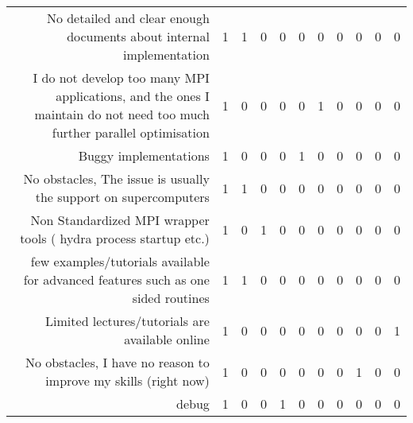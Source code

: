 {\begin{landscape}
\begin{longtable}[htb]{r|c|c|c|c|c|c|c|c|c|c}
{No detailed and clear enough documents about internal implementation} & 1 & 1 & 0 & 0 & 0 & 0 & 0 & 0 & 0 & 0 \\%
{I do not develop too many MPI applications, and the ones I maintain do not need too much further parallel optimisation} & 1 & 0 & 0 & 0 & 0 & 1 & 0 & 0 & 0 & 0 \\%
{Buggy implementations} & 1 & 0 & 0 & 0 & 1 & 0 & 0 & 0 & 0 & 0 \\%
{No obstacles, The issue is usually the support on supercomputers} & 1 & 1 & 0 & 0 & 0 & 0 & 0 & 0 & 0 & 0 \\%
{Non  Standardized MPI wrapper tools ( hydra process startup etc.)} & 1 & 0 & 1 & 0 & 0 & 0 & 0 & 0 & 0 & 0 \\%
{few examples/tutorials available for advanced features such as one sided routines} & 1 & 1 & 0 & 0 & 0 & 0 & 0 & 0 & 0 & 0 \\%
{Limited lectures/tutorials are available online} & 1 & 0 & 0 & 0 & 0 & 0 & 0 & 0 & 0 & 1 \\%
{No obstacles, I have no reason to improve my skills (right now)} & 1 & 0 & 0 & 0 & 0 & 0 & 0 & 1 & 0 & 0 \\%
{debug} & 1 & 0 & 0 & 1 & 0 & 0 & 0 & 0 & 0 & 0 \\%
\hline%
\end{longtable}%
\end{landscape}}%
\clearpage%

